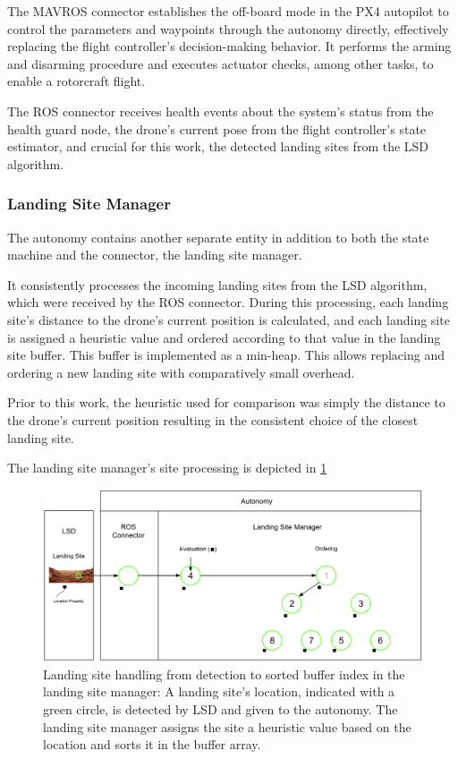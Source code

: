 \documentclass{article}
\begin{document}
The MAVROS connector establishes the off-board mode in the PX4 autopilot to control the parameters and waypoints through the autonomy directly, effectively replacing the flight controller's decision-making behavior. It performs the arming and disarming procedure and executes actuator checks, among other tasks, to enable a rotorcraft flight.

The ROS connector receives health events about the system's status from the health guard node, the drone's current pose from the flight controller's state estimator, and crucial for this work, the detected landing sites from the LSD algorithm.

\subsubsection{Landing Site Manager}\label{subsubsec:LSM}

The autonomy contains another separate entity in addition to both the state machine and the connector, the landing site manager. 

It consistently processes the incoming landing sites from the LSD algorithm, which were received by the ROS connector. During this processing, each landing site's distance to the drone's current position is calculated, and each landing site is assigned a heuristic value and ordered according to that value in the landing site buffer. This buffer is implemented as a min-heap. This allows replacing and ordering a new landing site with comparatively small overhead. 

Prior to this work, the heuristic used for comparison was simply the distance to the drone's current position resulting in the consistent choice of the closest landing site. 

The landing site manager's site processing is depicted in \cref{fig:lsm_ls_processing}

\begin{figure}[h]
\centering
\includegraphics[scale=0.165]{images/system_overview/lsm_handling.png}
\caption{Landing site handling from detection to sorted buffer index in the landing site manager: A landing site's location, indicated with a green circle, is detected by LSD and given to the autonomy. The landing site manager assigns the site a heuristic value based on the location and sorts it in the buffer array.}
\label{fig:lsm_ls_processing}
\end{figure}
\end{document}
